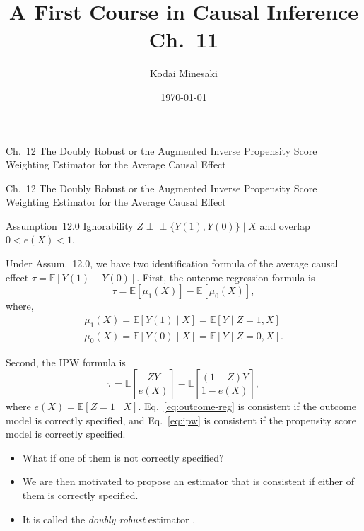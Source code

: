 \documentclass[aspectratio=169, 12pt]{beamer}
\title[]{A First Course in Causal Inference Ch.~11}
\author[Kodai Minesaki]{Kodai Minesaki}
\institute[Faculty of Engineering, The University of Tokyo]{Faculty of Engineering, The University of Tokyo}
\date{\today}
\newcommand{\indep}{\perp\!\!\!\perp}
\newcommand{\E}{\mathbb{E}}
\begin{document}
\begin{frame}
\titlepage
\end{frame}


\begin{frame}

  {
    \large
    Ch.~12 The Doubly Robust or the Augmented Inverse Propensity Score Weighting Estimator for the Average Causal Effect
  }
  
\end{frame}

\begin{frame}{Ch.~12 The Doubly Robust or the Augmented Inverse Propensity Score Weighting Estimator for the Average Causal Effect}
  \begin{keybox}{Assumption~12.0}
    Ignorability $Z\indep\{Y(1),Y(0)\}\mid X$ and overlap $0<e(X)<1$.
  \end{keybox}
  Under Assum.~12.0, we have two identification formula of the average causal effect $\tau=\E[Y(1)-Y(0)].$ First, the outcome regression formula is
  \begin{equation}
    \tau =\E[\mu_1(X)]-\E[\mu_0(X)],
    \label{eq:outcome-reg}
  \end{equation}
  where,
  \begin{gather*}
    \mu_1(X) = \E[Y(1)\mid X] = \E[Y\mid Z=1,X]\\
    \mu_0(X) = \E[Y(0)\mid X] = \E[Y\mid Z=0,X].
  \end{gather*}
\end{frame}

\begin{frame}
  Second, the IPW formula is
  \begin{equation}
    \tau = \E\left[\frac{ZY}{e(X)}\right] - \E\left[\frac{(1-Z)Y}{1-e(X)}\right],
    \label{eq:ipw}
  \end{equation}
  where $e(X)=\E[Z=1\mid X]$.
  Eq.~\eqref{eq:outcome-reg} is consistent if the outcome model is correctly specified, and Eq.~\eqref{eq:ipw} is consistent if the propensity score model is correctly specified.
  \begin{itemize}
    \item What if one of them is not correctly specified?
    \item We are then motivated to propose an estimator that is consistent if either of them is correctly specified.
    \item It is called the \textit{doubly robust} estimator \citep{scharfstein1999adjusting,bang2005doubly}.
  \end{itemize}
\end{frame}
\end{document}
